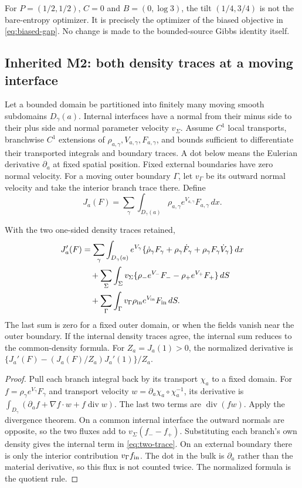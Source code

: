 For $P=(1/2,1/2)$, $C=0$ and $B=(0,\log3)$, the tilt $(1/4,3/4)$ is
not the bare-entropy optimizer. It is precisely the optimizer of the biased
objective in \eqref{eq:biased-gap}. No change is made to the bounded-source
Gibbs identity itself.

\subsection{Inherited M2: both density traces at a moving interface}
Let a bounded domain be partitioned into finitely many moving smooth
subdomains $D_\gamma(a)$. Internal interfaces have a normal from their minus
side to their plus side and normal parameter velocity $v_\Sigma$. Assume
$C^1$ local transports, branchwise $C^1$ extensions of
$\rho_{a,\gamma},V_{a,\gamma},F_{a,\gamma}$, and bounds sufficient to
differentiate their transported integrals and boundary traces. A dot below
means the Eulerian derivative $\partial_a$ at fixed spatial position.
Fixed external boundaries have zero normal velocity. For a moving outer
boundary $\Gamma$, let $v_\Gamma$ be its outward normal velocity and take
the interior branch trace there. Define
\[
 J_a(F)=\sum_\gamma\int_{D_\gamma(a)}
                \rho_{a,\gamma}e^{V_{a,\gamma}}F_{a,\gamma}\,dx.
\]
\begin{theorem}\label{thm:two-trace}
With the two one-sided density traces retained,
\begin{align}
 J_a'(F)&=\sum_\gamma\int_{D_\gamma(a)}e^{V_\gamma}
  \{\dot\rho_\gamma F_\gamma+\rho_\gamma\dot F_\gamma
                         +\rho_\gamma F_\gamma\dot V_\gamma\}\,dx\notag\\
 &\quad+\sum_\Sigma\int_\Sigma v_\Sigma
    \{\rho_-e^{V_-}F_--\rho_+e^{V_+}F_+\}\,dS\notag\\
 &\quad+\sum_\Gamma\int_\Gamma v_\Gamma\rho_{\rm in}
                      e^{V_{\rm in}}F_{\rm in}\,dS.
 \label{eq:two-trace}
\end{align}
The last sum is zero for a fixed outer domain, or when the fields vanish
near the outer boundary. If the internal density traces agree, the internal
sum reduces to the common-density formula. For $Z_a=J_a(1)>0$, the normalized
derivative is $\{J_a'(F)-(J_a(F)/Z_a)J_a'(1)\}/Z_a$.
\end{theorem}
\begin{proof}
Pull each branch integral back by its transport $\chi_a$ to a fixed domain.
For $f=\rho_\gamma e^{V_\gamma}F_\gamma$ and transport velocity
$w=\partial_a\chi_a\circ\chi_a^{-1}$, its derivative is
$\int_{D_\gamma}(\partial_af+\nabla f\cdot w+f\operatorname{div}w)$.
The last two terms are $\operatorname{div}(fw)$. Apply the divergence
theorem. On a common internal interface the outward normals are opposite,
so the two fluxes add to $v_\Sigma(f_--f_+)$. Substituting each branch's
own density gives the internal term in \eqref{eq:two-trace}. On an external
boundary there is only the interior contribution $v_\Gamma f_{\rm in}$.
The dot in the bulk is $\partial_a$ rather than the material derivative,
so this flux is not counted twice. The normalized formula is the quotient rule.
\end{proof}

